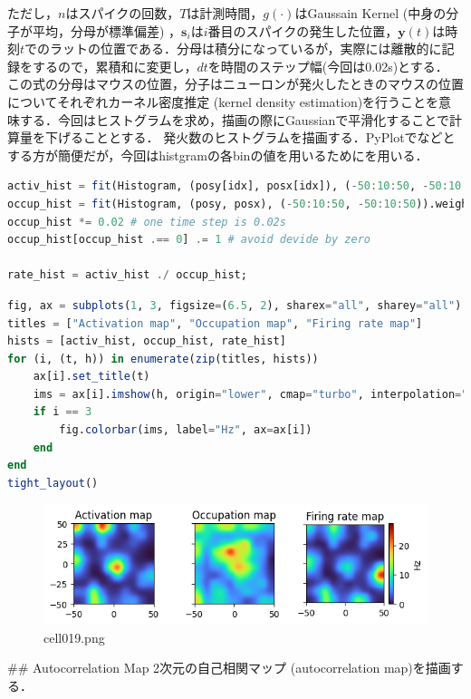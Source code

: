 ただし，$n$はスパイクの回数，$T$は計測時間，$g(\cdot)$はGaussain
Kernel (中身の分子が平均，分母が標準偏差) ，$\boldsymbol{s}_i$は$i$番目のスパイクの発生した位置，$\boldsymbol{y}(t)$は時刻$t$でのラットの位置である．分母は積分になっているが，実際には離散的に記録をするので，累積和に変更し，$dt$を時間のステップ幅(今回は0.02s)とする．
この式の分母はマウスの位置，分子はニューロンが発火したときのマウスの位置についてそれぞれカーネル密度推定 (kernel density estimation)を行うことを意味する．今回はヒストグラムを求め，描画の際にGaussianで平滑化することで計算量を下げることとする．
発火数のヒストグラムを描画する．PyPlotでなどとする方が簡便だが，今回はhistgramの各binの値を用いるためにを用いる．
\begin{lstlisting}[language=julia]
activ_hist = fit(Histogram, (posy[idx], posx[idx]), (-50:10:50, -50:10:50)).weights # activation
occup_hist = fit(Histogram, (posy, posx), (-50:10:50, -50:10:50)).weights　# occup position while trajectory 
occup_hist *= 0.02 # one time step is 0.02s 
occup_hist[occup_hist .== 0] .= 1 # avoid devide by zero

rate_hist = activ_hist ./ occup_hist;
\end{lstlisting}
\begin{lstlisting}[language=julia]
fig, ax = subplots(1, 3, figsize=(6.5, 2), sharex="all", sharey="all")
titles = ["Activation map", "Occupation map", "Firing rate map"]
hists = [activ_hist, occup_hist, rate_hist]
for (i, (t, h)) in enumerate(zip(titles, hists))
    ax[i].set_title(t)
    ims = ax[i].imshow(h, origin="lower", cmap="turbo", interpolation="gaussian", extent=[-50, 50, -50, 50])
    if i == 3
        fig.colorbar(ims, label="Hz", ax=ax[i])
    end
end
tight_layout()
\end{lstlisting}
\begin{figure}[ht]
	\centering
	\includegraphics[scale=0.8, max width=\linewidth]{./fig/appendix/grid-cells-decoding/cell019.png}
	\caption{cell019.png}
	\label{cell019.png}
\end{figure}
## Autocorrelation Map
2次元の自己相関マップ (autocorrelation map)を描画する．
